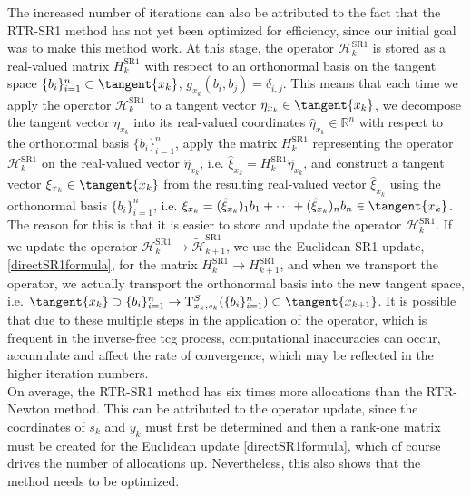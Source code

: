 The increased number of iterations can also be attributed to the fact that the RTR-SR1 method has not yet been optimized for efficiency, since our initial goal was to make this method work. At this stage, the operator $\mathcal{H}^{\mathrm{SR1}}_k$ is stored as a real-valued matrix $H^{\mathrm{SR1}}_k$ with respect to an orthonormal basis on the tangent space $\{ b_i \}^{n}_{i=1} \subset \tangent{x_k}$, $g_{x_k}(b_i, b_j) = \delta_{i,j}$. This means that each time we apply the operator $\mathcal{H}^{\mathrm{SR1}}_k$ to a tangent vector $\eta_{x_k} \in \tangent{x_k}$, we decompose the tangent vector $\eta_{x_k}$ into its real-valued coordinates $\hat{\eta}_{x_k} \in \mathbb{R}^n$ with respect to the orthonormal basis $\{ b_i \}^{n}_{i=1}$, apply the matrix $H^{\mathrm{SR1}}_k$ representing the operator $\mathcal{H}^{\mathrm{SR1}}_k$ on the real-valued vector $\hat{\eta}_{x_k}$, i.e. $\hat{\xi}_{x_k} = H^{\mathrm{SR1}}_k \hat{\eta}_{x_k}$, and construct a tangent vector $\xi_{x_k} \in \tangent{x_k}$ from the resulting real-valued vector $\hat{\xi}_{x_k}$ using the orthonormal basis $\{ b_i \}^{n}_{i=1}$, i.e. $\xi_{x_k} = (\hat{\xi}_{x_k})_{1} b_1 + \cdots + (\hat{\xi}_{x_k})_{n} b_n \in \tangent{x_k}$. The reason for this is that it is easier to store and update the operator $\mathcal{H}^{\mathrm{SR1}}_k$. If we update the operator $\mathcal{H}^{\mathrm{SR1}}_k \rightarrow \widetilde{\mathcal{H}}^{\mathrm{SR1}}_{k+1}$, we use the Euclidean SR1 update, \cref{directSR1formula}, for the matrix $H^{\mathrm{SR1}}_k \rightarrow H^{\mathrm{SR1}}_{k+1}$, and when we transport the operator, we actually transport the orthonormal basis into the new tangent space, i.e. $\tangent{x_k} \supset \{ b_i \}^{n}_{i=1} \rightarrow \mathrm{T}^{S}_{x_k, s_k}(\{ b_i \}^{n}_{i=1}) \subset \tangent{x_{k+1}}$. It is possible that due to these multiple steps in the application of the operator, which is frequent in the inverse-free tcg process, computational inaccuracies can occur, accumulate and affect the rate of convergence, which may be reflected in the higher iteration numbers. \\
On average, the RTR-SR1 method has six times more allocations than the RTR-Newton method. This can be attributed to the operator update, since the coordinates of $s_k$ and $y_k$ must first be determined and then a rank-one matrix must be created for the Euclidean update \cref{directSR1formula}, which of course drives the number of allocations up. Nevertheless, this also shows that the method needs to be optimized.  \\
